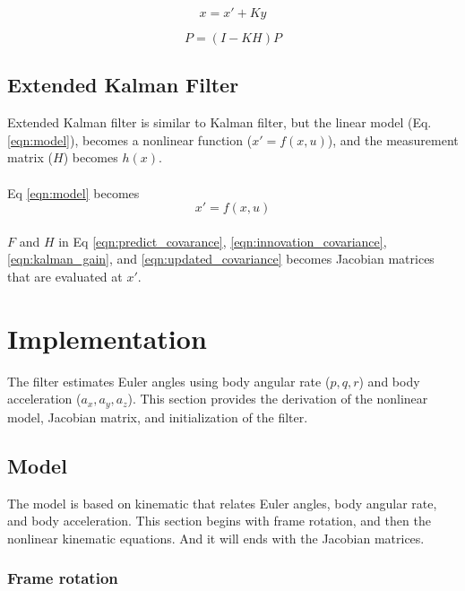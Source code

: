 \documentclass[]{article}
\begin{document}
\begin{equation}
x = x' + Ky\label{eqn:updated_states}
\end{equation}

\begin{equation}
P = (I-KH)P\label{eqn:updated_covariance}
\end{equation}

\subsection{Extended Kalman Filter}
Extended Kalman filter is similar to Kalman filter, but the linear model (Eq. \ref{eqn:model}), becomes a nonlinear function ($x' = f(x,u)$), and the measurement matrix ($H$) becomes $h(x)$.

\paragraph*{}
Eq \eqref{eqn:model} becomes
\begin{equation}
x' = f(x, u)
\end{equation}

\paragraph*{}
$F$ and $H$ in Eq \eqref{eqn:predict_covarance}, \eqref{eqn:innovation_covariance}, \eqref{eqn:kalman_gain}, and \eqref{eqn:updated_covariance} becomes Jacobian matrices that are evaluated at $x'$.

\section{Implementation}
The filter estimates Euler angles using body angular rate ($p, q, r$) and body acceleration ($a_x, a_y, a_z$). This section provides the derivation of the nonlinear model, Jacobian matrix, and initialization of the filter.

\subsection{Model}
The model is based on kinematic that relates Euler angles, body angular rate, and body acceleration. This section begins with frame rotation, and then the nonlinear kinematic equations. And it will ends with the Jacobian matrices. 

\subsubsection{Frame rotation}
\end{document}
